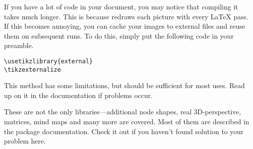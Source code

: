 If you have a lot of \TikZ{} code in your document, you may notice that
compiling it takes much longer. This is because
\TikZ{} redraws each picture with every \LaTeX{} pass. If this becomes
annoying, you can cache your images to external files and reuse them on
subsequent runs. To do this, simply put the following code in your preamble.
\begin{verbatim}
\usetikzlibrary{external}
\tikzexternalize
\end{verbatim}
This method has some limitations, but should be sufficient for most uses. Read
up on it in the documentation if problems occur.

These are not the only libraries---additional node shapes, real 3D-perspective,
matrices, mind maps and many more are covered. Most of them are described in
the  package documentation. Check it out if you haven't found
solution to your problem here.

